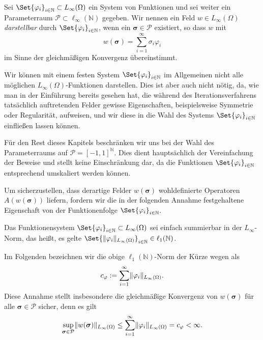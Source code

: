 \documentclass[../main.tex]{subfiles}
\begin{document}
\begin{Definition}
\label{definition:feld_entwickelbar}
    Sei $\Set{\varphi_{i}}_{i \in \mathbb{N}} \subset L_{\infty}(\Omega)$ ein System von Funktionen und sei weiter ein Parameterraum $\mathcal P \subset \ell_{\infty}(\mathbb{N})$ gegeben.
    Wir nennen ein Feld $w \in L_{\infty}(\Omega)$ \emph{darstellbar} durch $\Set{\varphi_{i}}_{i \in \mathbb{N}}$, wenn ein $\bm{\sigma} \in \mathcal P$ existiert, so dass $w$ mit
    \begin{equation}
        w(\bm\sigma) = \sum_{i = 1}^{\infty} \sigma_{i} \varphi_{i}
    \end{equation}
    im Sinne der gleichmäßigen Konvergenz übereinstimmt.
\end{Definition}

Wir können mit einem festen System $\Set{\varphi_{i}}_{i \in \mathbb{N}}$ im Allgemeinen nicht alle möglichen $L_{\infty}(\Omega)$-Funktionen darstellen.
Dies ist aber auch nicht nötig, da, wie man in der Einführung bereits gesehen hat, die während des Iterationsverfahrens tatsächlich auftretenden Felder gewisse Eigenschaften, beispielsweise Symmetrie oder Regularität, aufweisen, und wir diese in die Wahl des Systems $\Set{\varphi_{i}}_{i \in \mathbb{N}}$ einfließen lassen können.

\begin{Bemerkung}
    Für den Rest dieses Kapitels beschränken wir uns bei der Wahl des Parameterraums auf $\mathcal P = [-1, 1]^{\mathbb{N}}$.
    Dies dient hauptsächlich der Vereinfachung der Beweise und stellt keine Einschränkung dar, da die Funktionen $\Set{ \varphi_{i} }_{i \in \mathbb{N}}$ entsprechend umskaliert werden können.
\end{Bemerkung}

Um sicherzustellen, dass derartige Felder $w(\bm\sigma)$ wohldefinierte Operatoren $A(w(\bm\sigma))$ liefern, fordern wir die in der folgenden Annahme festgehaltene Eigenschaft von der Funktionenfolge $\Set{\varphi_{i}}_{i \in \mathbb{N}}$.

\begin{Annahme}
\label{annahme:system_l1_summierbar}
    Das Funktionensystem $\Set{ \varphi_{i} }_{i \in \mathbb{N}} \subset L_{\infty}(\Omega)$ sei einfach summierbar in der $L_{\infty}$-Norm, das heißt, es gelte $\Set{ \norm{\varphi_{i}}_{L_{\infty}(\Omega) } }_{i \in \mathbb{N}} \in \ell_{1}(\mathbb{N})$.
\end{Annahme}
%
Im Folgenden bezeichnen wir die obige $\ell_{1}(\mathbb{N})$-Norm der Kürze wegen als
\begin{equation}
\label{eq:system_l1_norm}
    c_{\varphi} := \sum_{i = 1}^{\infty} \lVert\varphi_{i}\rVert_{L_{\infty}(\Omega)}.
\end{equation}
Diese Annahme stellt insbesondere die gleichmäßige Konvergenz von $w(\bm\sigma)$ für alle $\bm\sigma \in \mathcal P$ sicher, denn es gilt
\begin{equation}
\label{eq:rz_feld_norm_schranke}
    \sup_{\bm\sigma \in \mathcal P} \lVert w(\bm\sigma)\rVert_{L_{\infty}(\Omega)} \leq \sum_{i = 1}^{\infty} \lVert\varphi_{i}\rVert_{L_{\infty}(\Omega)} = c_{\varphi} < \infty.
\end{equation}
\end{document}
